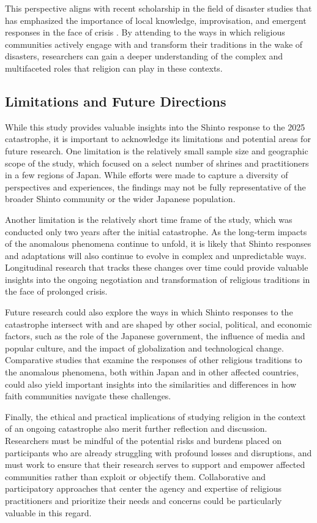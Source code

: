 \documentclass[12pt, a4paper]{article}
\begin{document}
This perspective aligns with recent scholarship in the field of disaster studies that has emphasized the importance of local knowledge, improvisation, and emergent responses in the face of crisis \citep{tierney2014, chandler2016}. By attending to the ways in which religious communities actively engage with and transform their traditions in the wake of disasters, researchers can gain a deeper understanding of the complex and multifaceted roles that religion can play in these contexts.

\subsection{Limitations and Future Directions}
While this study provides valuable insights into the Shinto response to the 2025 catastrophe, it is important to acknowledge its limitations and potential areas for future research. One limitation is the relatively small sample size and geographic scope of the study, which focused on a select number of shrines and practitioners in a few regions of Japan. While efforts were made to capture a diversity of perspectives and experiences, the findings may not be fully representative of the broader Shinto community or the wider Japanese population.

Another limitation is the relatively short time frame of the study, which was conducted only two years after the initial catastrophe. As the long-term impacts of the anomalous phenomena continue to unfold, it is likely that Shinto responses and adaptations will also continue to evolve in complex and unpredictable ways. Longitudinal research that tracks these changes over time could provide valuable insights into the ongoing negotiation and transformation of religious traditions in the face of prolonged crisis.

Future research could also explore the ways in which Shinto responses to the catastrophe intersect with and are shaped by other social, political, and economic factors, such as the role of the Japanese government, the influence of media and popular culture, and the impact of globalization and technological change. Comparative studies that examine the responses of other religious traditions to the anomalous phenomena, both within Japan and in other affected countries, could also yield important insights into the similarities and differences in how faith communities navigate these challenges.

Finally, the ethical and practical implications of studying religion in the context of an ongoing catastrophe also merit further reflection and discussion. Researchers must be mindful of the potential risks and burdens placed on participants who are already struggling with profound losses and disruptions, and must work to ensure that their research serves to support and empower affected communities rather than exploit or objectify them. Collaborative and participatory approaches that center the agency and expertise of religious practitioners and prioritize their needs and concerns could be particularly valuable in this regard.
\end{document}
